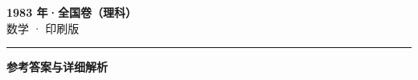 \documentclass[zihao=5, a4paper]{ctexart}
\begin{document}
\begin{center}
  {\Large\bfseries 1983 年·全国卷（理科）}\\[4pt]
  {\large 数学 · 印刷版}
\end{center}
\medskip
{}

\par\bigskip\hrule\bigskip
{}
\begin{center}{\large\bfseries 参考答案与详细解析}\end{center}
\smallskip

\end{document}
